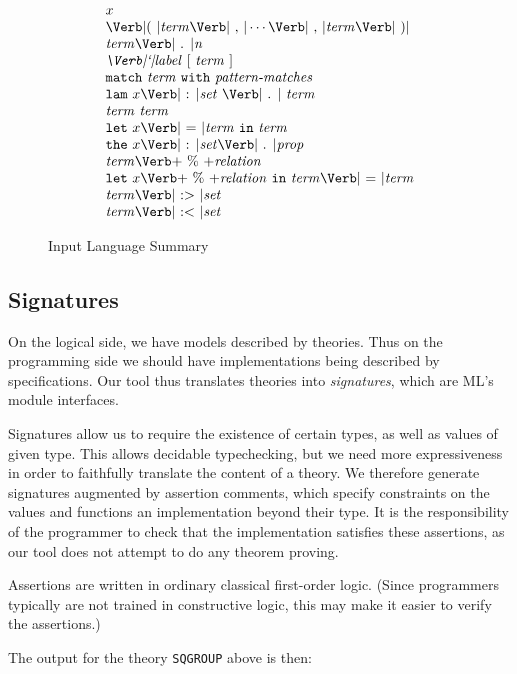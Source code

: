 \begin{figure}
\[\begin{array}{l}
x\\
\LPAREN \Term\COMMA \cdots \COMMA \Term \RPAREN\\
\Term\PERIOD \metav{n}\\
\Label\ [\ \Term\ ]\\
\MATCH\ \Term\ \WITH\ \mbox{\textit{pattern-matches}}\\
\LAMBDA\ x\COLON\Set\ \PERIOD\ \Term\\
\Term\ \Term\\
\LET\ x\EQUALS\Term\ \IN\ \Term\\
\THE\ x\COLON\Set \PERIOD \Prop\\
\Term \PERCENT \metav{relation}\\
\LET\ x \PERCENT \metav{relation}\ \IN\ \Term\EQUALS\Term\\
\Term \SUBIN \Set\\
\Term \SUBOUT \Set\\
\end{array}
\]  
\caption{Input Language Summary}
\label{fig:input}  
\end{figure}

\subsection{Signatures}
\label{sec:signatures}

On the logical side, we have models described by theories.  Thus on
the programming side we should have implementations being described by
specifications.  Our tool thus translates theories into
\emph{signatures}, which are ML's module interfaces.

Signatures allow us to require the existence of certain types, as well
as values of given type.  This allows decidable typechecking, but we
need more expressiveness in order to faithfully translate the content
of a theory.  We therefore generate signatures augmented by assertion
comments, which specify constraints on the values and functions an
implementation beyond their type.  It is the responsibility of the
programmer to check that the implementation satisfies these
assertions, as our tool does not attempt to do any theorem proving.

Assertions are written in ordinary classical first-order logic. (Since
programmers typically are not trained in constructive logic, this
may make it easier to verify the assertions.)

The output for the theory \Verb|SQGROUP| above is then:

